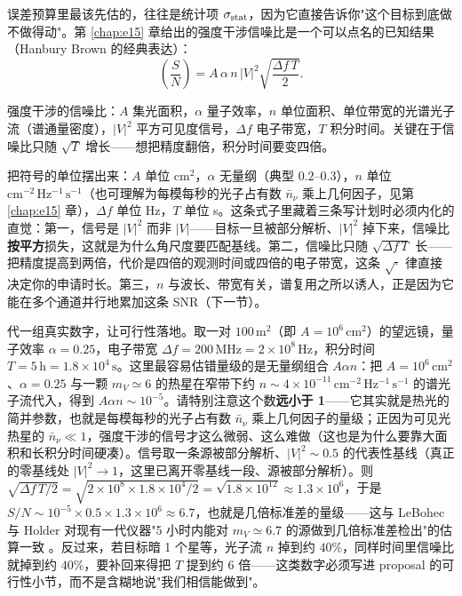 误差预算里最该先估的，往往是统计项 \(\sigma_{\rm stat}\)，因为它直接告诉你"这个目标到底做不做得动"。第 \ref{chap:e15} 章给出的强度干涉信噪比是一个可以点名的已知结果（Hanbury Brown 的经典表达）：
\begin{equation}
  \left(\frac{S}{N}\right)
  =
  A\,\alpha\,n\,|V|^2
  \sqrt{\frac{\Delta f\,T}{2}} .
  \label{eq:e28-snr}
\end{equation}
\begin{formulaexplain}
强度干涉的信噪比：\(A\) 集光面积，\(\alpha\) 量子效率，\(n\) 单位面积、单位带宽的光谱光子流（谱通量密度），\(|V|^2\) 平方可见度信号，\(\Delta f\) 电子带宽，\(T\) 积分时间。关键在于信噪比只随 \(\sqrt{T}\) 增长——想把精度翻倍，积分时间要变四倍。
\end{formulaexplain}
把符号的单位摆出来：\(A\) 单位 \(\mathrm{cm^2}\)，\(\alpha\) 无量纲（典型 \(0.2\text{--}0.3\)），\(n\) 单位 \(\mathrm{cm^{-2}\,Hz^{-1}\,s^{-1}}\)（也可理解为每模每秒的光子占有数 \(\bar n_\nu\) 乘上几何因子，见第 \ref{chap:e15} 章），\(\Delta f\) 单位 Hz，\(T\) 单位 s。这条式子里藏着三条写计划时必须内化的直觉：第一，信号是 \(|V|^2\) 而非 \(|V|\)——目标一旦被部分解析、\(|V|^2\) 掉下来，信噪比\textbf{按平方}损失，这就是为什么角尺度要匹配基线。第二，信噪比只随 \(\sqrt{\Delta f\,T}\) 长——把精度提高到两倍，代价是四倍的观测时间或四倍的电子带宽，这条 \(\sqrt{\cdot}\) 律直接决定你的申请时长。第三，\(n\) 与波长、带宽有关，谱复用之所以诱人，正是因为它能在多个通道并行地累加这条 SNR（下一节）。

代一组真实数字，让可行性落地。取一对 \(100\,\mathrm{m^2}\)（即 \(A=10^6\,\mathrm{cm^2}\)）的望远镜，量子效率 \(\alpha=0.25\)，电子带宽 \(\Delta f=200\,\mathrm{MHz}=2\times10^8\,\mathrm{Hz}\)，积分时间 \(T=5\,\mathrm{h}=1.8\times10^4\,\mathrm{s}\)。这里最容易估错量级的是无量纲组合 \(A\alpha n\)：把 \(A=10^6\,\mathrm{cm^2}\)、\(\alpha=0.25\) 与一颗 \(m_V\simeq6\) 的热星在窄带下约 \(n\sim4\times10^{-11}\,\mathrm{cm^{-2}\,Hz^{-1}\,s^{-1}}\) 的谱光子流代入，得到 \(A\alpha n\sim10^{-5}\)。请特别注意这个数\textbf{远小于 1}——它其实就是热光的简并参数，也就是每模每秒的光子占有数 \(\bar n_\nu\) 乘上几何因子的量级；正因为可见光热星的 \(\bar n_\nu\ll1\)，强度干涉的信号才这么微弱、这么难做（这也是为什么要靠大面积和长积分时间硬凑）。信号取一条源被部分解析、\(|V|^2\sim0.5\) 的代表性基线（真正的零基线处 \(|V|^2\to1\)，这里已离开零基线一段、源被部分解析）。则 \(\sqrt{\Delta f\,T/2}=\sqrt{2\times10^8\times1.8\times10^4/2}=\sqrt{1.8\times10^{12}}\approx1.3\times10^6\)，于是 \(S/N\sim10^{-5}\times0.5\times1.3\times10^6\approx6.7\)，也就是几倍标准差的量级——这与 LeBohec 与 Holder 对现有一代仪器"5 小时内能对 \(m_V\simeq6.7\) 的源做到几倍标准差检出"的估算一致 \citep{2006ApJ...649..399L,2013APh....43..331D}。反过来，若目标暗 1 个星等，光子流 \(n\) 掉到约 \(40\%\)，同样时间里信噪比就掉到约 \(40\%\)，要补回来得把 \(T\) 提到约 \(6\) 倍——这类数字必须写进 proposal 的可行性小节，而不是含糊地说"我们相信能做到"。

